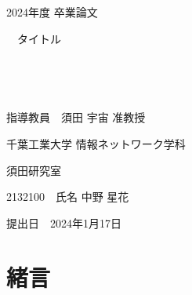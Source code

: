 \documentclass[12pt,a4j,titlepage]{ltjsarticle}
\begin{document}
\begin{titlepage}
  \begin{center}
  
    \vspace*{20truept}
    
    {\LARGE 2024年度 卒業論文} 
    
    \vspace*{75truept}
    
    {\Huge 　タイトル}　%

    \vspace{10truept}

    {\Huge }　%

    \vspace{10truept}

    {\Huge }　%

    \vspace{85truept}
    
    {\LARGE 指導教員　須田 宇宙 准教授}
    
    \vspace{60truept}
    
    {\LARGE 千葉工業大学 情報ネットワーク学科}
    
    \vspace{15truept}
    
    {\LARGE 須田研究室}
    
    \vspace{70truept}
    
    {\LARGE 2132100　氏名 中野 星花 }　%

    \vspace{70truept}
    
  \end{center}
  \begin{flushright}

    {\LARGE 提出日　2024年1月17日}
  
  \end{flushright}
\end{titlepage}

\setcounter{tocdepth}{3}
\tableofcontents

\clearpage

\listoftables
\listoffigures
\clearpage

\section{緒言}\label{緒言}
\end{document}
